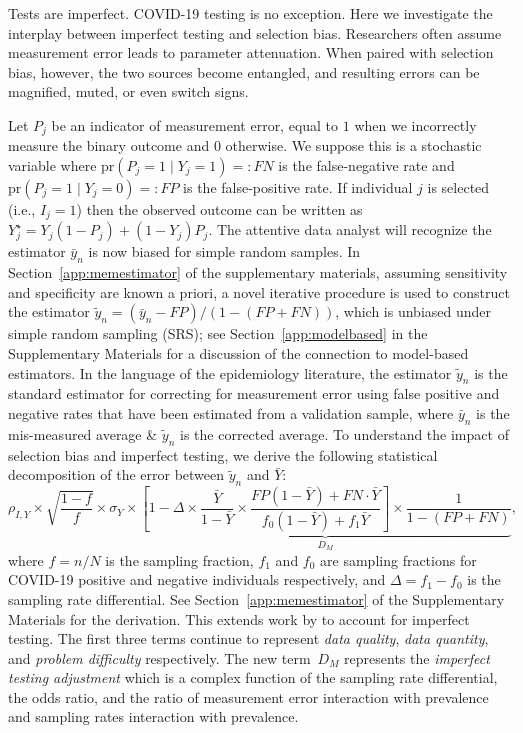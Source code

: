 \documentclass[11pt]{amsart}
\numberwithin{equation}{section}
\theoremstyle{plain}
\def\pr{\text{pr}}
\begin{document}
 Tests are imperfect.  COVID-19 testing is no exception. Here we investigate the interplay between imperfect testing and selection bias.  Researchers often assume measurement error leads to parameter attenuation.  When paired with selection bias, however, the two sources become entangled, and resulting errors can be magnified, muted, or even switch signs.

 Let $P_j$ be an indicator of measurement error, equal to $1$ when we incorrectly measure the binary outcome and $0$ otherwise. We suppose this is a stochastic variable where $\pr(P_j = 1 \mid Y_j = 1) =: FN$ is the false-negative rate and $\pr(P_j = 1 \mid Y_j = 0) =: FP$ is the false-positive rate.  If individual $j$ is selected (i.e., $I_j = 1$) then the observed outcome can be written as $Y_j^{\star} = Y_j(1-P_j) + (1-Y_j) P_j$.  The attentive data analyst will recognize the estimator $\bar y_n$ is now biased for simple random samples.  In Section~\ref{app:memestimator} of the supplementary materials, assuming sensitivity and specificity are known a priori, a novel iterative procedure is used to construct the estimator $\tilde y_n = (\bar y_n - FP)/(1-(FP+FN))$, which is unbiased under simple random sampling (SRS); see Section~\ref{app:modelbased} in the Supplementary Materials for a discussion of the connection to model-based estimators. In the language of the epidemiology literature, the estimator $\tilde y_n$ is the standard estimator for correcting for measurement error using false positive and negative rates that have been estimated from a validation sample, where $\bar y_n$ is the mis-measured average \& $\tilde y_n$ is the corrected average. To understand the impact of selection bias and imperfect testing, we derive the following statistical decomposition of the error between $\tilde y_n$ and $\bar Y$:
 \begin{equation}
 \label{eq:statdecomp}
 \rho_{I,Y} \times \sqrt{\frac{1-f}{f}} \times \sigma_{Y}
 \times \underbrace{\left[ 1 - \Delta \times \frac{\bar Y}{1-\bar Y} \times \frac{FP(1-\bar Y) + FN \cdot \bar Y}{f_0 (1-\bar Y) + f_1 \bar Y} \right] \times \frac{1}{1-(FP+FN)}}_{D_M},
 \end{equation}
 where $f=n/N$ is the sampling fraction, $f_1$ and $f_0$ are sampling fractions for COVID-19 positive and negative individuals respectively, and $\Delta = f_1 - f_0$ is the sampling rate differential.  See Section~\ref{app:memestimator} of the Supplementary Materials for the derivation. This extends work by \cite{Meng2018} to account for imperfect testing. The first three terms continue to represent \emph{data quality}, \emph{data quantity}, and \emph{problem difficulty} respectively.  The new term~$D_M$ represents the \emph{imperfect testing adjustment} which is a complex function of the sampling rate differential, the odds ratio, and the ratio of measurement error interaction with prevalence and sampling rates interaction with prevalence.
\end{document}
